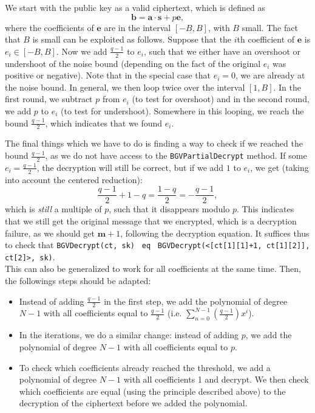\documentclass{article}
\begin{document}
We start with the public key as a valid ciphertext, which is defined as
\begin{equation}
  \mathbf{b} = \mathbf{a} \cdot \mathbf{s} + p \mathbf{e},
\end{equation}
where the coefficients of $\mathbf{e}$ are in the interval $[-B, B]$, with $B$
small. The fact that $B$ is small can be exploited as follows. Suppose that the
$i$th coefficient of $\mathbf{e}$ is $e_i \in [-B, B]$. Now we add
$\frac{q-1}{2}$ to $e_i$, such that we either have an overshoot or undershoot of
the noise bound (depending on the fact of the original $e_i$ was positive or
negative). Note that in the special case that $e_i = 0$, we are already at the
noise bound. In general, we then loop twice over the interval $[1, B]$. In the
first round, we subtract $p$ from $e_i$ (to test for overshoot) and in the
second round, we add $p$ to $e_i$ (to test for undershoot). Somewhere in this
looping, we reach the bound $\frac{q-1}{2}$, which indicates that we found
$e_i$.

The final things which we have to do is finding a way to check if we reached the
bound $\frac{q-1}{2}$, as we do not have access to the
\texttt{BGVPartialDecrypt} method. If some $e_i = \frac{q-1}{2}$, the decryption
will still be correct, but if we add $1$ to $e_i$, we get (taking into account
the centered reduction):
\begin{equation}
  \frac{q-1}{2} + 1 - q = \frac{1-q}{2} = - \frac{q-1}{2},
\end{equation} 
which is \textit{still} a multiple of $p$, such that it disappears modulo $p$.
This indicates that we still get the original message that we encrypted, which
is a decryption failure, as we should get $\mathbf{m} + 1$, following the
decryption equation. It suffices thus to check that \texttt{BGVDecrypt(ct, sk)
} \texttt{eq} \ \texttt{BGVDecrypt(<[ct[1][1]+1, ct[1][2]], ct[2]>, sk)}. \\

This can also be generalized to work for all coefficients at the same time.
Then, the followings steps should be adapted:
\begin{itemize}
  \item Instead of adding $\frac{q-1}{2}$ in the first step, we add the
    polynomial of degree $N-1$ with all coefficients equal to $\frac{q-1}{2}$
    (i.e. $\sum_{n=0}^{N-1} \left( \frac{q-1}{2} \right) x^i$).
  \item In the iterations, we do a similar change: instead of adding $p$, we add
    the polynomial of degree $N-1$ with all coefficients equal to $p$.
  \item To check which coefficients already reached the threshold, we add a
    polynomial of degree $N-1$ with all coefficients 1 and decrypt. We then
    check which coefficients are equal (using the principle described above) to
    the decryption of the ciphertext before we added the polynomial.
\end{itemize}
\end{document}
